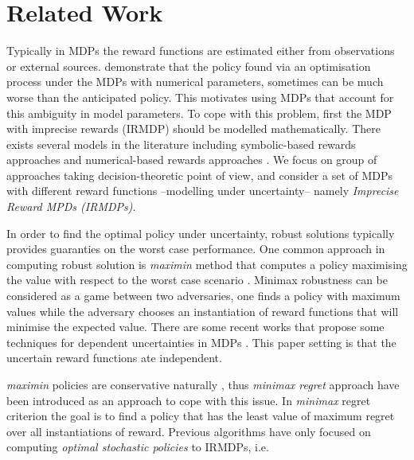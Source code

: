 \section{Related Work}

Typically in MDPs the reward functions are estimated either from observations or external sources.  demonstrate that the policy found via an optimisation process under the MDPs with numerical parameters, sometimes can be much worse than the anticipated policy. This motivates using MDPs that account for this ambiguity in model parameters. To cope with this problem, first the MDP with imprecise rewards (IRMDP) should be modelled mathematically. There exists several models in the literature including symbolic-based rewards approaches \cite{Furnkranz2012,Weng2012} and numerical-based rewards approaches \cite{bell1982,Regan2009,Xu2009}. We focus on group of approaches taking decision-theoretic point of view, and consider a set of MDPs with different reward functions --modelling under uncertainty-- namely \textit{Imprecise Reward MPDs (IRMDPs)}. 


In order to find the optimal policy under uncertainty, robust solutions typically provides guaranties on the worst case performance. One common approach in computing robust solution is \textit{maximin} method that computes a policy maximising the value with respect to the worst case scenario \cite{Nilim2005,Iyengar2005,GIVAN2000,mastin2012}. Minimax robustness can be considered as a game between two adversaries, one finds a policy with maximum values while the adversary chooses an instantiation of reward functions that will minimise the expected value. There are some recent works that propose some techniques for dependent uncertainties in MDPs \cite{Wiesemann2013,Mannor2012}. This paper setting is that the uncertain reward functions ate independent. 

\textit{maximin} policies are conservative naturally \cite{Delage2007}, thus \textit{minimax regret} approach \cite{Regan2009,Xu2009} have been introduced as an approach to cope with this issue. In \textit{minimax} regret criterion the goal is to find a policy that has the least value of maximum regret over all instantiations of reward. Previous algorithms \cite{Regan2010,Xu2009,Regan2009} have only focused on computing  \textit{optimal stochastic policies} to IRMDPs, i.e. 